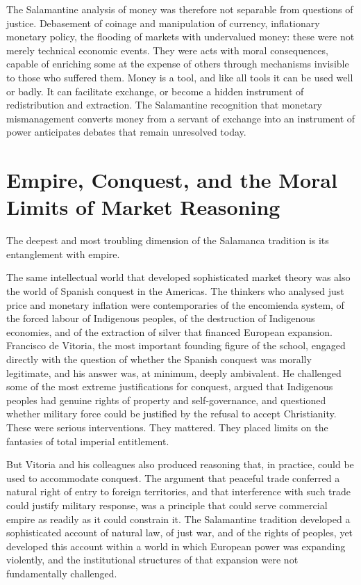 \documentclass[11pt,a4paper,oneside]{book}
\begin{document}
The Salamantine analysis of money was therefore not separable from questions of justice. Debasement of coinage and manipulation of currency, inflationary monetary policy, the flooding of markets with undervalued money: these were not merely technical economic events. They were acts with moral consequences, capable of enriching some at the expense of others through mechanisms invisible to those who suffered them. Money is a tool, and like all tools it can be used well or badly. It can facilitate exchange, or become a hidden instrument of redistribution and extraction. The Salamantine recognition that monetary mismanagement converts money from a servant of exchange into an instrument of power anticipates debates that remain unresolved today.

\section*{Empire, Conquest, and the Moral Limits of Market Reasoning}

The deepest and most troubling dimension of the Salamanca tradition is its entanglement with empire.

The same intellectual world that developed sophisticated market theory was also the world of Spanish conquest in the Americas. The thinkers who analysed just price and monetary inflation were contemporaries of the encomienda system, of the forced labour of Indigenous peoples, of the destruction of Indigenous economies, and of the extraction of silver that financed European expansion. Francisco de Vitoria, the most important founding figure of the school, engaged directly with the question of whether the Spanish conquest was morally legitimate, and his answer was, at minimum, deeply ambivalent. He challenged some of the most extreme justifications for conquest, argued that Indigenous peoples had genuine rights of property and self-governance, and questioned whether military force could be justified by the refusal to accept Christianity. These were serious interventions. They mattered. They placed limits on the fantasies of total imperial entitlement.

But Vitoria and his colleagues also produced reasoning that, in practice, could be used to accommodate conquest. The argument that peaceful trade conferred a natural right of entry to foreign territories, and that interference with such trade could justify military response, was a principle that could serve commercial empire as readily as it could constrain it. The Salamantine tradition developed a sophisticated account of natural law, of just war, and of the rights of peoples, yet developed this account within a world in which European power was expanding violently, and the institutional structures of that expansion were not fundamentally challenged.
\end{document}
